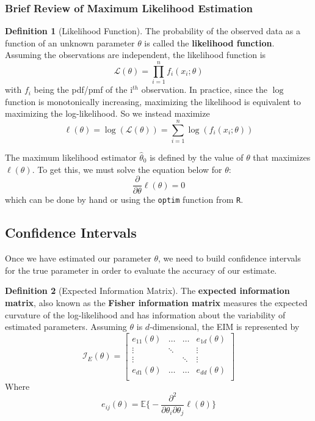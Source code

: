\documentclass{article}
\theoremstyle{definition}
\theoremstyle{definition}
\newtheorem{definition}{Definition}
\def\E{\mathbb{E}}
\def\l{\ell}
\def\sumn{\sum^n_{i=1}}
\def\fish{\mathcal{I}}
\begin{document}
\subsubsection{Brief Review of Maximum Likelihood Estimation}
\begin{definition}[Likelihood Function] The probability of the observed data as a function of an unknown parameter $\theta$ is called the \textbf{likelihood function}. Assuming the observations are independent, the likelihood function is
\[\mathcal{L}(\theta)=\prod_{i=1}^n f_i(x_i; \theta)\]
with $f_i$ being the pdf/pmf of the i$^{th}$ observation. In practice, since the $\log$ function is monotonically increasing, maximizing the likelihood is equivalent to maximizing the log-likelihood. So we instead maximize 
\[\l(\theta)= \log(\mathcal{L}(\theta))= \sumn \log(f_i(x_i;\theta))\]

The maximum likelihood estimator $\hat{\theta}_0$ is defined by the value of $\theta$ that maximizes $\l(\theta)$. To get this, we must solve the equation below for $\theta$:
\[\frac{\partial}{\partial \theta} \l(\theta)=0\]
which can be done by hand or using the \texttt{optim} function from \texttt{R}.
\end{definition}

\subsection{Confidence Intervals}
Once we have estimated our parameter $\theta$, we need to build confidence intervals for the true parameter in order to evaluate the accuracy of our estimate.

\begin{definition}[Expected Information Matrix] The \textbf{expected information matrix}, also known as the \textbf{Fisher information matrix} measures the expected curvature of the log-likelihood and has information about the variability of estimated parameters. Assuming $\theta$ is $d$-dimensional, the EIM is represented by 
\[\fish_E(\theta)= \begin{bmatrix}e_{11}(\theta) &\hdots &\hdots & e_{1d}(\theta)\\
\vdots& \ddots & & \vdots\\
\vdots& &\ddots & \vdots\\
e_{d1}(\theta)& \hdots & \hdots& e_{dd}(\theta)\\
\end{bmatrix}\]
Where 
\[e_{ij}(\theta)=\E\bigg\{- \frac{\partial^2}{\partial \theta_i\partial\theta_j}\l(\theta) \bigg\}\]
\end{definition}
\end{document}
